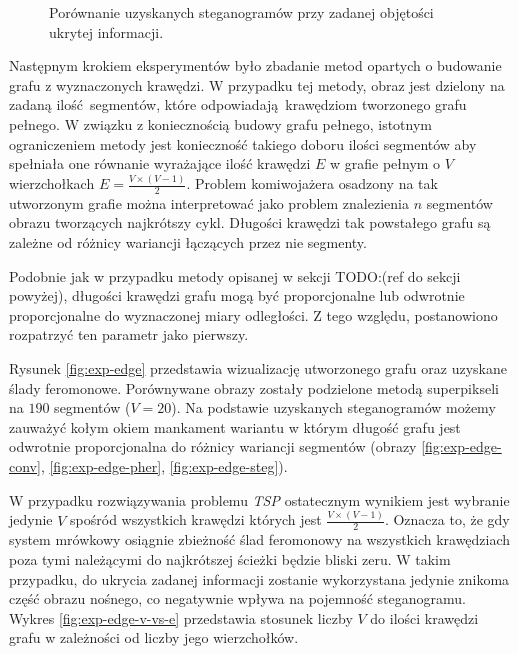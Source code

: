 {\begin{figure}
        \caption[Porównanie rezultatów]
        {
            Porównanie uzyskanych steganogramów przy zadanej objętości ukrytej informacji.
        }
        \label{fig:exp-vertex-results}
    \end{figure}

    Następnym krokiem eksperymentów było zbadanie metod opartych o budowanie grafu z wyznaczonych krawędzi. W przypadku
    tej metody, obraz jest dzielony na zadaną ilość segmentów, które odpowiadają krawędziom tworzonego grafu pełnego. W
    związku z koniecznością budowy grafu pełnego, istotnym ograniczeniem metody jest konieczność takiego doboru ilości
    segmentów aby spełniała one równanie wyrażające ilość krawędzi $E$ w grafie pełnym o $V$ wierzchołkach $E = \frac{V
    \times (V - 1)}{2}$. Problem komiwojażera osadzony na tak utworzonym grafie można interpretować jako problem
    znalezienia $n$ segmentów obrazu tworzących najkrótszy cykl. Długości krawędzi tak powstałego grafu są zależne od
    różnicy wariancji łączących przez nie segmenty.

    Podobnie jak w przypadku metody opisanej w sekcji TODO:(ref do sekcji powyżej), długości krawędzi grafu mogą być
    proporcjonalne lub odwrotnie proporcjonalne do wyznaczonej miary odległości. Z tego względu, postanowiono rozpatrzyć
    ten parametr jako pierwszy.

    Rysunek \ref{fig:exp-edge} przedstawia wizualizację utworzonego grafu oraz uzyskane ślady feromonowe. Porównywane
    obrazy zostały podzielone metodą superpikseli na $190$ segmentów ($V = 20$). Na podstawie uzyskanych steganogramów
    możemy zauważyć kołym okiem mankament wariantu w którym długość grafu jest odwrotnie proporcjonalna do różnicy
    wariancji segmentów (obrazy \ref{fig:exp-edge-conv}, \ref{fig:exp-edge-pher}, \ref{fig:exp-edge-steg}).

    W przypadku rozwiązywania problemu \textit{TSP} ostatecznym wynikiem jest wybranie jedynie $V$ spośród wszystkich
    krawędzi których jest $\frac{V \times (V - 1)}{2}$. Oznacza to, że gdy system mrówkowy osiągnie zbieżność ślad
    feromonowy na wszystkich krawędziach poza tymi należącymi do najkrótszej ścieżki będzie bliski zeru. W takim
    przypadku, do ukrycia zadanej informacji zostanie wykorzystana jedynie znikoma część obrazu nośnego, co negatywnie
    wpływa na pojemność steganogramu. Wykres \ref{fig:exp-edge-v-vs-e} przedstawia stosunek liczby $V$ do ilości
    krawędzi grafu w zależności od liczby jego wierzchołków.

}
